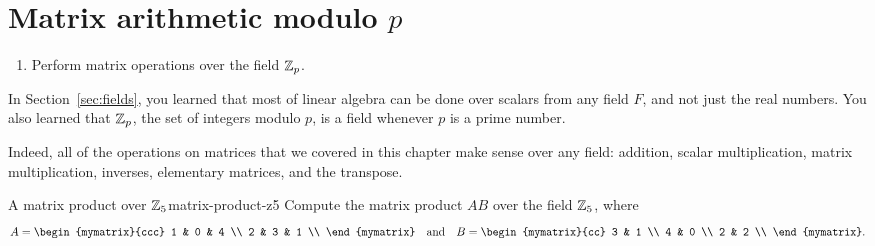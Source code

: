 \section{Matrix arithmetic modulo $p$}

\begin{outcome}
  \begin{enumerate}
  \item Perform matrix operations over the field $\mathbb{Z}_p$.
  \end{enumerate}
\end{outcome}

In Section~\ref{sec:fields}, you learned that most of linear algebra
can be done over scalars from any field $F$, and not just the real
numbers. You also learned that $\mathbb{Z}_p$, the set of integers modulo $p$,
is a field whenever $p$ is a prime number.

Indeed, all of the operations on matrices that we covered in this
chapter make sense over any field: addition, scalar multiplication,
matrix multiplication, inverses, elementary matrices, and the
transpose.

\begin{example}{A matrix product over $\mathbb{Z}_5$}{matrix-product-z5}
  Compute the matrix product $AB$ over the field $\mathbb{Z}_5$, where
  \begin{equation*}
    A = \begin{mymatrix}{ccc}
      1 & 0 & 4 \\
      2 & 3 & 1 \\
    \end{mymatrix}
    \quad\mbox{and}\quad
    B = \begin{mymatrix}{cc}
      3 & 1 \\
      4 & 0 \\
      2 & 2 \\
    \end{mymatrix}.
  \end{equation*}
\end{example}

